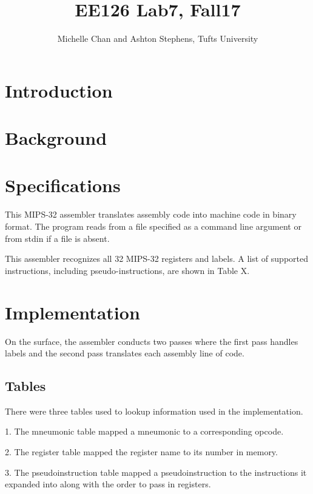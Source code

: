 \documentclass[titlepage]{article}
\title{EE126 Lab7, Fall17}
\author{Michelle Chan and Ashton Stephens, Tufts University}
\begin{document}
\begin{titlepage}
\maketitle
\end{titlepage}

\section*{Introduction}


\section*{Background}

\section*{Specifications}

This MIPS-32 assembler translates assembly code into machine code in binary
format. The program reads from a file specified as a command line argument
or from stdin if a file is absent. 

This assembler recognizes all 32 MIPS-32 registers and labels. A list of 
supported instructions, including pseudo-instructions, are shown in Table X. 


\section*{Implementation}

On the surface, the assembler conducts two passes where the first pass handles 
labels and the second pass translates each assembly line of code. 

\subsection*{Tables}
There were three tables used to lookup information used in the implementation.

1. The mneumonic table mapped a mneumonic to a corresponding opcode.

2. The register table mapped the register name to its number in memory.

3. The pseudoinstruction table mapped a pseudoinstruction to the instructions
it expanded into along with the order to pass in registers.
\end{document}

